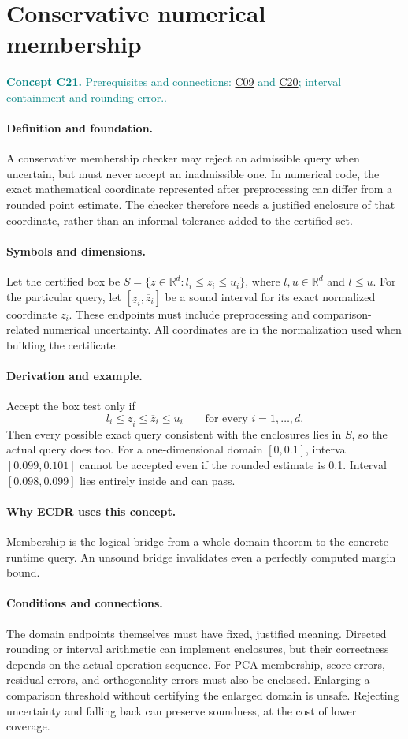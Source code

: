 \documentclass[11pt,a4paper]{article}
\newcommand{\R}{\mathbb R}
\newcommand{\conceptid}{Front matter}
\newcommand{\concept}[3]{\clearpage\renewcommand{\conceptid}{#1}%
\section{#2}\label{concept:#1}%
\textcolor{teal}{\textbf{Concept #1.} Prerequisites and connections: #3.}\par
\typeout{ECDR-CONCEPT-START #1 PAGE=\thepage}}
\begin{document}
\concept{C21}{Conservative numerical membership}{\hyperref[concept:C09]{C09} and \hyperref[concept:C20]{C20}; interval containment and rounding error.}
\paragraph{Definition and foundation.}
A conservative membership checker may reject an admissible query when uncertain, but must never accept an inadmissible one. In numerical code, the exact mathematical coordinate represented after preprocessing can differ from a rounded point estimate. The checker therefore needs a justified enclosure of that coordinate, rather than an informal tolerance added to the certified set.
\paragraph{Symbols and dimensions.}
Let the certified box be $S=\{z\in\R^d:l_i\le z_i\le u_i\}$, where $l,u\in\R^d$ and $l\le u$. For the particular query, let $[\underline z_i,\overline z_i]$ be a sound interval for its exact normalized coordinate $z_i$. These endpoints must include preprocessing and comparison-related numerical uncertainty. All coordinates are in the normalization used when building the certificate.
\paragraph{Derivation and example.}
Accept the box test only if
\[
 l_i\le\underline z_i\le\overline z_i\le u_i
 \qquad\text{for every }i=1,\ldots,d.
\]
Then every possible exact query consistent with the enclosures lies in $S$, so the actual query does too. For a one-dimensional domain $[0,0.1]$, interval $[0.099,0.101]$ cannot be accepted even if the rounded estimate is 0.1. Interval $[0.098,0.099]$ lies entirely inside and can pass.
\paragraph{Why ECDR uses this concept.}
Membership is the logical bridge from a whole-domain theorem to the concrete runtime query. An unsound bridge invalidates even a perfectly computed margin bound.
\paragraph{Conditions and connections.}
The domain endpoints themselves must have fixed, justified meaning. Directed rounding or interval arithmetic can implement enclosures, but their correctness depends on the actual operation sequence. For PCA membership, score errors, residual errors, and orthogonality errors must also be enclosed. Enlarging a comparison threshold without certifying the enlarged domain is unsafe. Rejecting uncertainty and falling back can preserve soundness, at the cost of lower coverage.
\par\label{endconcept:C21}
\end{document}
